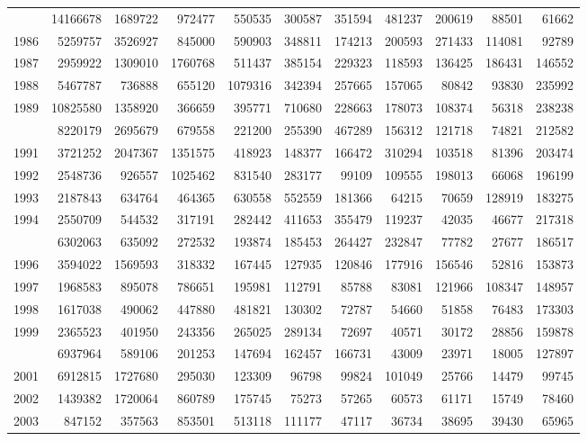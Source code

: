 \documentclass[
]{article}
\begin{document}
\begin{longtable}[t]{lrrrrrrrrrr}
\addlinespace
1985 & 14166678 & 1689722 & 972477 & 550535 & 300587 & 351594 & 481237 & 200619 & 88501 & 61662\\
1986 & 5259757 & 3526927 & 845000 & 590903 & 348811 & 174213 & 200593 & 271433 & 114081 & 92789\\
1987 & 2959922 & 1309010 & 1760768 & 511437 & 385154 & 229323 & 118593 & 136425 & 186431 & 146552\\
1988 & 5467787 & 736888 & 655120 & 1079316 & 342394 & 257665 & 157065 & 80842 & 93830 & 235992\\
1989 & 10825580 & 1358920 & 366659 & 395771 & 710680 & 228663 & 178073 & 108374 & 56318 & 238238\\
\addlinespace
1990 & 8220179 & 2695679 & 679558 & 221200 & 255390 & 467289 & 156312 & 121718 & 74821 & 212582\\
1991 & 3721252 & 2047367 & 1351575 & 418923 & 148377 & 166472 & 310294 & 103518 & 81396 & 203474\\
1992 & 2548736 & 926557 & 1025462 & 831540 & 283177 & 99109 & 109555 & 198013 & 66068 & 196199\\
1993 & 2187843 & 634764 & 464365 & 630558 & 552559 & 181366 & 64215 & 70659 & 128919 & 183275\\
1994 & 2550709 & 544532 & 317191 & 282442 & 411653 & 355479 & 119237 & 42035 & 46677 & 217318\\
\addlinespace
1995 & 6302063 & 635092 & 272532 & 193874 & 185453 & 264427 & 232847 & 77782 & 27677 & 186517\\
1996 & 3594022 & 1569593 & 318332 & 167445 & 127935 & 120846 & 177916 & 156546 & 52816 & 153873\\
1997 & 1968583 & 895078 & 786651 & 195981 & 112791 & 85788 & 83081 & 121966 & 108347 & 148957\\
1998 & 1617038 & 490062 & 447880 & 481821 & 130302 & 72787 & 54660 & 51858 & 76483 & 173303\\
1999 & 2365523 & 401950 & 243356 & 265025 & 289134 & 72697 & 40571 & 30172 & 28856 & 159878\\
\addlinespace
2000 & 6937964 & 589106 & 201253 & 147694 & 162457 & 166731 & 43009 & 23971 & 18005 & 127897\\
2001 & 6912815 & 1727680 & 295030 & 123309 & 96798 & 99824 & 101049 & 25766 & 14479 & 99745\\
2002 & 1439382 & 1720064 & 860789 & 175745 & 75273 & 57265 & 60573 & 61171 & 15749 & 78460\\
2003 & 847152 & 357563 & 853501 & 513118 & 111177 & 47117 & 36734 & 38695 & 39430 & 65965\\

\end{longtable}
\end{document}
